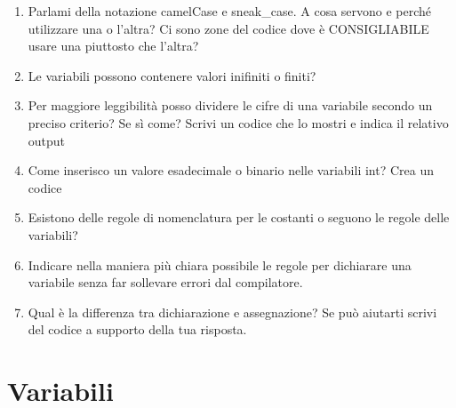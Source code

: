 \documentclass{article}
\begin{document}
\begin{enumerate}
\begin{verbatim}
    \end{verbatim}

    \item Parlami della notazione camelCase e sneak\_case. A cosa servono e perché utilizzare una o l'altra?
    Ci sono zone del codice dove è CONSIGLIABILE usare una piuttosto che l'altra?

    \item Le variabili possono contenere valori inifiniti o finiti?
    
    \item Per maggiore leggibilità posso dividere le cifre di una variabile secondo un preciso criterio? 
    Se sì come? Scrivi un codice che lo mostri e indica il relativo output

    \item Come inserisco un valore esadecimale o binario nelle variabili int? Crea un codice

    \item Esistono delle regole di nomenclatura per le costanti o seguono le regole delle variabili?
    
    \item Indicare nella maniera più chiara possibile le regole per dichiarare una variabile
    senza far sollevare errori dal compilatore.

    \item Qual è la differenza tra dichiarazione e assegnazione? Se può aiutarti scrivi del codice a supporto
    della tua risposta.

\end{enumerate}

\section{Variabili}
\end{document}
